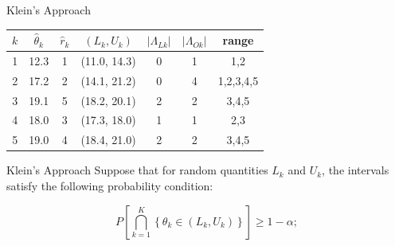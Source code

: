 \documentclass[
  11pt,
  ignorenonframetext,
]{beamer}
\begin{document}
\begin{frame}{Klein's Approach}
\label{kleins-approach-1}
\begin{center}
\begin{tabular}{ |c|c|c|c|c|c|c| }
\hline
$k$ & $\hat\theta_k$ & $\hat r_k$ & $(L_k, U_k)$ & $\vert \Lambda_{Lk} \vert$ & $\vert \Lambda_{Ok} \vert$ & range \\
\hline \hline
1 & {12.3} & {1} & (11.0, 14.3) & 0 & 1 & 1,2 \\
2 & {17.2} & {2} & (14.1, 21.2) & 0 & 4 & 1,2,3,4,5 \\  
3 & {19.1} & {5} & (18.2, 20.1) & 2 & 2 & 3,4,5 \\  
4 & {18.0} & {3} & (17.3, 18.0) & 1 & 1 & 2,3 \\  
5 & {19.0} & {4} & (18.4, 21.0) & 2 & 2 & 3,4,5 \\  
\hline
\end{tabular}
\end{center}

\end{frame}

\begin{frame}{Klein's Approach}
\label{kleins-approach-2}
Suppose that for random quantities \(L_k\) and \(U_k\), the intervals
satisfy the following probability condition:

\begin{equation}
  P\left[ \bigcap^K_{k=1} \left\{ \theta_k \in \left(L_k, U_k\right) \right\} \right] \geq 1-\alpha;
  \label{eq:joint_cov1}
\end{equation}


\end{frame}
\end{document}
